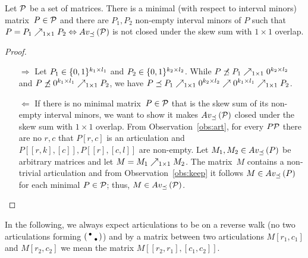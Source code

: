 \begin{obs}
\label{obs:rel}
Let $\mathcal{P}$ be a set of matrices. There is a minimal (with respect to interval minors) matrix~$P\in\mathcal{P}$ and there are $P_1,P_2$ non-empty interval minors of $P$ such that $P=P_1\nearrow_{1\times1}P_2\Leftrightarrow Av_{\preceq}\left(\mathcal{P}\right)$ is not closed under the skew sum with $1\times1$ overlap.
\end{obs}
\begin{proof}
\begin{itemize}
	\item[$\Rightarrow$] Let $P_1\in\{0,1\}^{k_1\times l_1}$ and $P_2\in\{0,1\}^{k_2\times l_2}$. While $P\not\preceq P_1\nearrow_{1\times1}0^{k_2\times l_2}$ and $P\not\preceq0^{k_1\times l_1}\nearrow_{1\times1}P_2$, we have $P\preceq P_1\nearrow_{1\times1}0^{k_2\times l_2}\nearrow0^{k_1\times l_1}\nearrow_{1\times1}P_2$.
	\item[$\Leftarrow$] If there is no minimal matrix~$P\in\mathcal{P}$ that is the skew sum of its non-empty interval minors, we want to show it makes $Av_{\preceq}\left(\mathcal{P}\right)$ closed under the skew sum with $1\times1$ overlap. From Observation~\ref{obs:art}, for every $P\mathcal{P}$ there are no $r,c$ that $P[r,c]$ is an articulation and $P[[r,k],[c]],P[[r],[c,l]]$ are non-empty. Let $M_1,M_2\in Av_{\preceq}\left(P\right)$ be arbitrary matrices and let $M=M_1\nearrow_{1\times1}M_2$. The matrix~$M$ contains a non-trivial articulation and from Observation~\ref{obs:keep} it follows $M\in Av_{\preceq}\left(P\right)$ for each minimal $P\in\mathcal{P}$; thus, $M\in Av_{\preceq}\left(\mathcal{P}\right)$.
\end{itemize}
\end{proof}

In the following, we always expect articulations to be on a reverse walk (no two articulations forming $\left(\begin{smallmatrix}\bullet& \\ &\bullet\end{smallmatrix}\right)$) and by a matrix between two articulations $M[r_1,c_1]$ and $M[r_2,c_2]$ we mean the matrix $M[[r_2,r_1],[c_1,c_2]]$.

